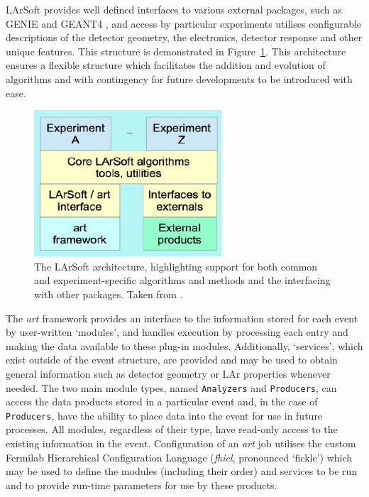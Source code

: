 LArSoft provides well defined interfaces to various external packages, such as GENIE \cite{GENIE2010} and GEANT4 \cite{GEANT42006}, and access by particular experiments utilises configurable descriptions of the detector geometry, the electronics, detector response and other unique features.  This structure is demonstrated in Figure~\ref{fig:LArSoftStructure}.  This architecture ensures a flexible structure which facilitates the addition and evolution of algorithms and with contingency for future developments to be introduced with ease.

\begin{figure}
  \centering
  \includegraphics[width=7cm]{LArSoftStructure.pdf}
  \caption[The LArSoft architecture, highlighting support for both common and experiment-specific algorithms and methods and the interfacing with other packages.]{The LArSoft architecture, highlighting support for both common and experiment-specific algorithms and methods and the interfacing with other packages.  Taken from \cite{LArSoft2016}.}
  \label{fig:LArSoftStructure}
\end{figure}

The \textit{art} framework provides an interface to the information stored for each event by user-written `modules', and handles execution by processing each entry and making the data available to these plug-in modules.  Additionally, `services', which exist outside of the event structure, are provided and may be used to obtain general information such as detector geometry or LAr properties whenever needed.  The two main module types, named \texttt{Analyzers} and \texttt{Producers}, can access the data products stored in a particular event and, in the case of \texttt{Producers}, have the ability to place data into the event for use in future processes.  All modules, regardless of their type, have read-only access to the existing information in the event.  Configuration of an \textit{art} job utilises the custom Fermilab Hierarchical Configuration Language (\textit{fhicl}, pronounced `fickle') which may be used to define the modules (including their order) and services to be run and to provide run-time parameters for use by these products.

